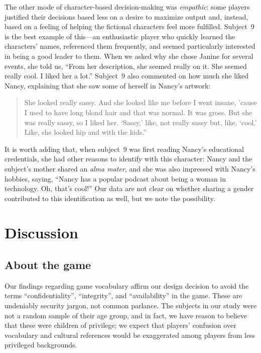 \documentclass[letterpaper]{article}
\begin{document}
The other mode of character-based decision-making was \textit{empathic}:
some players justified their decisions based less on a desire to
maximize output and, instead, based on a feeling of helping the
fictional characters feel more fulfilled.
Subject~9 is the best example of this---an enthusiastic player
who quickly learned the characters' names, referenced them frequently,
and seemed particularly interested in being a good leader to them.
When we asked why she chose Janine for several events, she told us, 
``From her description, she seemed really on it. She seemed really cool.
I liked her a lot.'' 
Subject~9 also commented on how much she liked Nancy, explaining that
she saw some of herself in Nancy's artwork:
\begin{quote}
She looked really sassy. And she looked like me before
I went insane, 'cause I used to have long blond hair and that was
normal. It was gross. But she was really sassy, so I liked her.
`Sassy,' like, not really sassy but, like, `cool.' Like, she looked hip
and with the kids.'' 
\end{quote}
It is worth adding that, when subject~9 was first reading Nancy's 
educational credentials, she had other reasons to identify with
this character: Nancy and the subject's mother shared an \textit{alma mater},
and she was also impressed with Nancy's hobbies, saying, ``Nancy has a popular podcast about being a woman in technology. Oh, that's cool!'' 
Our data are not clear on whether sharing a gender contributed to this
identification as well, but we note the possibility.


\section{Discussion}
\label{sec:discussion}

\subsection{About the game}

Our findings regarding game vocabulary affirm our design decision
to avoid the terms ``confidentiality'', ``integrity'', and ``availability''
in the game. These are undeniably security jargon, not common parlance.
The subjects in our study were not a random sample of their age group,
and in fact, we have reason to believe that these were children of
privilege; we expect that players' confusion over vocabulary
and cultural references would be exaggerated among players from
less privileged backgrounds.
\end{document}
